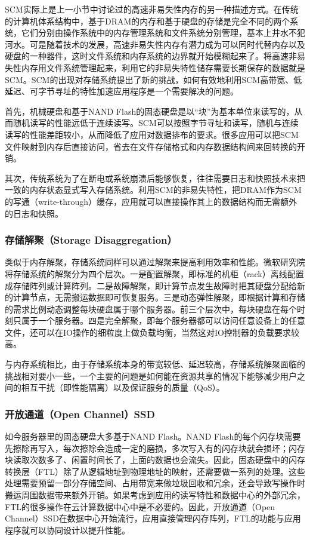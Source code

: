 SCM实际上是上一小节中讨论过的高速非易失性内存的另一种描述方式。在传统的计算机体系结构中，基于DRAM的内存和基于硬盘的存储是完全不同的两个系统，它们分别由操作系统中的内存管理系统和文件系统分别管理，基本上井水不犯河水。可是随着技术的发展，高速非易失性内存有潜力成为可以同时代替内存以及硬盘的一种器件，这时文件系统和内存系统的边界就开始模糊起来了。将高速非易失性内存用文件系统管理起来，利用它的非易失特性储存需要长期保存的数据就是SCM。SCM的出现对存储系统提出了新的挑战，如何有效地利用SCM高带宽、低延迟、可字节寻址的特性加速应用程序是一个需要解决的问题。

首先，机械硬盘和基于NAND Flash的固态硬盘是以“块”为基本单位来读写的，从而随机读写的性能远低于连续读写。SCM可以按照字节寻址和读写，随机与连续读写的性能差距较小，从而降低了应用对数据排布的要求。很多应用可以把SCM文件映射到内存后直接访问，省去在文件存储格式和内存数据结构间来回转换的开销。

其次，传统系统为了在断电或系统崩溃后能够恢复，往往需要日志和快照技术来把一致的内存状态显式写入存储系统。利用SCM的非易失特性，把DRAM作为SCM的写通（write-through）缓存，应用就可以直接操作其上的数据结构而无需额外的日志和快照。

\subsubsection{存储解聚（Storage Disaggregation）}

类似于内存解聚，存储系统同样可以通过解聚来提高利用效率和性能。微软研究院将存储系统的解聚分为四个层次。一是配置解聚，即标准的机柜（rack）离线配置成存储阵列或计算阵列。二是故障解聚，即计算节点发生故障时把其硬盘分配给新的计算节点，无需搬运数据即可恢复服务。三是动态弹性解聚，即根据计算和存储的需求比例动态调整每块硬盘属于哪个服务器。前三个层次中，每块硬盘在每个时刻只属于一个服务器。四是完全解聚，即每个服务器都可以访问任意设备上的任意文件，还可以在IO操作的细粒度上做负载均衡，当然这对IO控制器的负载要求较高。

与内存系统相比，由于存储系统本身的带宽较低、延迟较高，存储系统解聚面临的挑战相对要小一些，一个主要的问题是如何能在资源共享的情况下能够减少用户之间的相互干扰（即性能隔离）以及保证服务的质量（QoS）。

\subsubsection{开放通道（Open Channel）SSD}

如今服务器里的固态硬盘大多基于NAND Flash。NAND Flash的每个闪存块需要先擦除再写入，每次擦除会造成一定的磨损，多次写入有的闪存块就会损坏；闪存块读取次数多了、闲置时间长了，上面的数据也会流失。因此，固态硬盘中的闪存转换层（FTL）除了从逻辑地址到物理地址的映射，还需要做一系列的处理。这些处理需要预留一部分存储空间、占用带宽来做垃圾回收和冗余，还会导致写操作时搬运周围数据带来额外开销。如果考虑到应用的读写特性和数据中心的外部冗余，FTL的很多操作在云计算数据中心中是不必要的。因此，开放通道（Open Channel）SSD在数据中心开始流行，应用直接管理闪存阵列，FTL的功能与应用程序就可以协同设计以提升性能。


